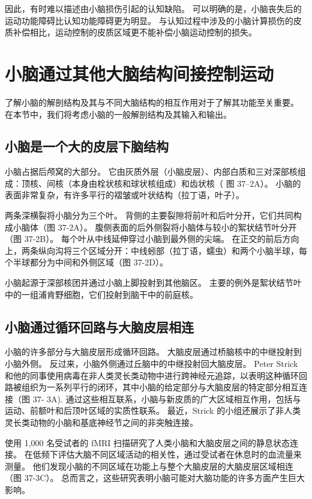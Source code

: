 因此，有时难以描述由小脑损伤引起的认知缺陷。 可以明确的是，小脑丧失后的运动功能障碍比认知功能障碍更为明显。 与认知过程中涉及的小脑计算损伤的皮质补偿相比，运动控制的皮质区域更不能补偿小脑运动控制的损失。



\section{小脑通过其他大脑结构间接控制运动}
了解小脑的解剖结构及其与不同大脑结构的相互作用对于了解其功能至关重要。 在本节中，我们将考虑小脑的一般解剖结构及其输入和输出。

\subsection{小脑是一个大的皮层下脑结构}
小脑占据后颅窝的大部分。 它由灰质外层（小脑皮层）、内部白质和三对深部核组成：顶核、间核（本身由栓状核和球状核组成）和齿状核（ 图 37–2A）。 小脑的表面非常复杂，有许多平行的褶皱或叶状结构（拉丁语，叶子）。

两条深横裂将小脑分为三个叶。 背侧的主要裂隙将前叶和后叶分开，它们共同构成小脑体（图 37-2A）。 腹侧表面的后外侧裂将小脑体与较小的絮状结节叶分开（图 37-2B）。 每个叶从中线延伸穿过小脑到最外侧的尖端。 在正交的前后方向上，两条纵向沟将三个区域分开：中线蚓部（拉丁语，蠕虫）和两个小脑半球，每个半球都分为中间和外侧区域（图 37-2D）。

小脑起源于深部核团并通过小脑上脚投射到其他脑区。 主要的例外是絮状结节叶中的一组浦肯野细胞，它们投射到脑干中的前庭核。

\subsection{小脑通过循环回路与大脑皮层相连}
小脑的许多部分与大脑皮层形成循环回路。 大脑皮层通过桥脑核中的中继投射到小脑外侧。 反过来，小脑外侧通过丘脑中的中继投射回大脑皮层。 Peter Strick 和他的同事使用病毒在非人类灵长类动物中进行跨神经元追踪，以表明这种循环回路被组织为一系列平行的闭环，其中小脑的给定部分与大脑皮层的特定部分相互连接（图 37- 3A). 通过这些相互联系，小脑与新皮质的广大区域相互作用，包括与运动、前额叶和后顶叶区域的实质性联系。 最近，Strick 的小组还展示了非人类灵长类动物的小脑和基底神经节之间的非突触连接。

使用 1,000 名受试者的 fMRI 扫描研究了人类小脑和大脑皮层之间的静息状态连接。 在低频下评估大脑不同区域活动的相关性，通过受试者在休息时的血流量来测量。 他们发现小脑的不同区域在功能上与整个大脑皮层的大脑皮层区域相连（图 37-3C）。 总而言之，这些研究表明小脑可能对大脑功能的许多方面产生巨大影响。



